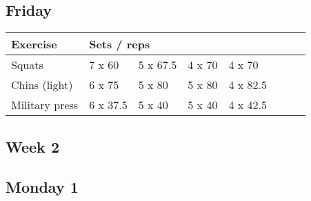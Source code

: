 \documentclass[12pt, a4paper]{article}%
\begin{document}
  \subsection*{\hspace{0.5em} Friday }


  \begin{tabular}{l|lllllll}
  \hspace{0.75em} \textbf{Exercise} & \multicolumn{ 7 }{l}{ \textbf{Sets / reps} } \\ \hline

            \hspace{0.75em} Squats
            & 7 x 60
            & 5 x 67.5
            & 4 x 70
            & 4 x 70
            & 
            & 
            & 
            \\


            \hspace{0.75em} Chins (light)
            & 6 x 75
            & 5 x 80
            & 5 x 80
            & 4 x 82.5
            & 
            & 
            & 
            \\


            \hspace{0.75em} Military press
            & 6 x 37.5
            & 5 x 40
            & 5 x 40
            & 4 x 42.5
            & 
            & 
            & 
            \\


  \end{tabular}


\clearpage \subsection*{\hspace{0.25em} Week 2 }
  \subsection*{\hspace{0.5em} Monday 1 }
\end{document}
